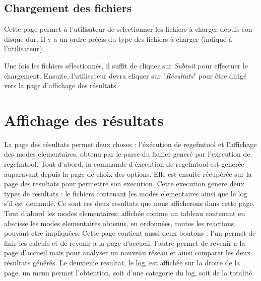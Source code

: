 \subsection{Chargement des fichiers}
Cette page permet à l'utilisateur de sélectionner les fichiers à charger depuis son disque dur. Il y a un ordre précis du type des fichiers à charger (indiqué à l'utilisateur). 


Une fois les fichiers sélectionnés, il suffit de cliquer sur \textit{Submit} pour effectuer le chargement. Ensuite, l'utilisateur devra cliquer sur "\textit{Résultats}" pour être dirigé vers la page d'affichage des résultats.  

\section{Affichage des résultats}

La page des résultats permet deux choses : l'éxécution de regefmtool et l'affichage des modes elementaires, obtenu par le parse du fichier generé par l'execution de regefmtool. Tout d'abord, la commande d'éxecution de regefmtool est generée auparavant depuis la page de choix des options. Elle est ensuite récupérée sur la page des resultats pour permettre son execution.
Cette execution genere deux types de resultats : le fichiers contenant les modes elementaires ainsi que le log s'il est demandé. Ce sont ces deux resultats que nous afficherons dans cette page.
Tout d'abord les modes elementaires, affichée comme un tableau contenant en abscisse les modes elementaires obtenus, en ordonnées, toutes les reactions pouvant etre impliquées.
Cette page contient aussi deux boutons : l'un permet de finir les calculs et de revenir a la page d'accueil, l'autre permet de revenir a la page d'accueil mais pour analyser un nouveau réseau et ainsi comparer les deux résultats générés.
Le deuxieme resultat, le log, est affichée sur la droite de la page. un menu permet l'obtention,  soit d'une categorie du log, soit de la totalité.












 